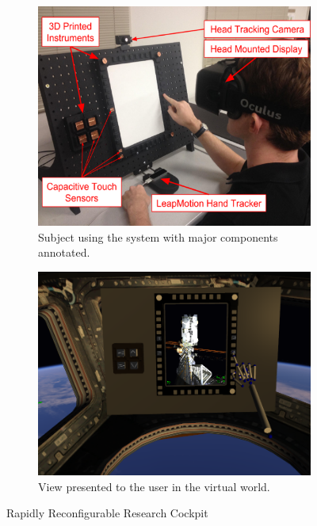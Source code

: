 \documentclass[]{aiaa-tc}%
\begin{document}
\begin{figure}[tb]
  \centering
  \begin{subfigure}{.49\textwidth}
    \centering
    \includegraphics[width=.99\linewidth]{figures/r3c_callout.png}
    \caption{Subject using the system with major components annotated.}
    \label{fig:r3c_sub1}
  \end{subfigure}
  \begin{subfigure}{.49\textwidth}
    \centering
    \includegraphics[width=.99\linewidth]{figures/virtual_world.png}
    \caption{View presented to the user in the virtual world.}
    \label{fig:r3c_sub2}
  \end{subfigure}
  \caption{Rapidly Reconfigurable Research Cockpit}
  \label{fig:r3c}
\end{figure}
\end{document}
